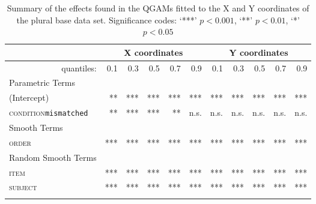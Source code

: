 \begin{table}[H]\fontsize{10}{11}
\caption{Summary of the effects found in the QGAMs fitted to the X and Y coordinates of the plural base data set. Significance codes: `***' $p < 0.001$, `**' $p < 0.01$, `*' $p < 0.05$}
\label{tab:7.12}
\centering
\begin{tabular}{lrrrrrrrrrr}
\lsptoprule
~                   & \multicolumn{5}{c}{X coordinates}                              & \multicolumn{5}{c}{Y coordinates}                               \\
\midrule
\multicolumn{1}{r}{quantiles:}          & 0.1        & 0.3        & 0.5        & 0.7        & 0.9        & 0.1        & 0.3        & 0.5        & 0.7        & 0.9         \\
\midrule
Parametric Terms    & \textbf{~} & \textbf{~} & \textbf{~} & \textbf{~} & \textbf{~} & \textbf{~} & \textbf{~} & \textbf{~} & \textbf{~} & \textbf{~}  \\
\midrule
(Intercept)         & **        & ***        & ***        & ***        & ***        & ***        & ***        & ***        & ***        & ***          \\
\textsc{condition}\texttt{mismatched} & **       & ***          & ***        & **        & n.s.        & n.s.       & n.s.        & n.s.        & n.s.        & n.s.         \\
\midrule
Smooth Terms        & \textbf{~} & \textbf{~} & \textbf{~} & \textbf{~} & \textbf{~} & \textbf{~} & \textbf{~} & \textbf{~} & \textbf{~} & \textbf{~}  \\
\midrule
\textsc{order}               & ***        & ***        & ***        & ***        & ***        & ***        & ***        & ***        & ***        & ***         \\
\midrule
Random Smooth Terms & \textbf{~} & \textbf{~} & \textbf{~} & \textbf{~} & \textbf{~} & \textbf{~} & \textbf{~} & \textbf{~} & \textbf{~} & \textbf{~}  \\
\midrule
\textsc{item}                & ***        & ***        & ***        & ***        & ***        & ***        & ***        & ***        & ***        & ***         \\
\textsc{subject}             & ***        & ***        & ***        & ***        & ***        & ***        & ***        & ***        & ***        & ***        \\
\lspbottomrule
\end{tabular}
\end{table}



